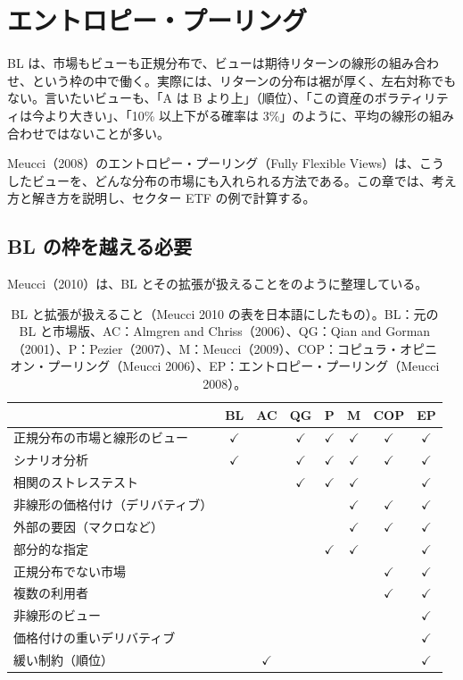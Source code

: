 \chapter{エントロピー・プーリング}\label{ch:ep}

BL は、市場もビューも正規分布で、ビューは期待リターンの線形の組み合わせ、という枠の中で働く。実際には、リターンの分布は裾が厚く、左右対称でもない。言いたいビューも、「A は B より上」（順位）、「この資産のボラティリティは今より大きい」、「10\% 以上下がる確率は 3\%」のように、平均の線形の組み合わせではないことが多い。

Meucci（2008）のエントロピー・プーリング（Fully Flexible Views）は、こうしたビューを、どんな分布の市場にも入れられる方法である。この章では、考え方と解き方を説明し、セクター ETF の例で計算する。

\section{BL の枠を越える必要}

Meucci（2010）は、BL とその拡張が扱えることをのように整理している。

\begin{table}[htbp]
\centering
\caption{BL と拡張が扱えること（Meucci 2010 の表を日本語にしたもの）。BL：元の BL と市場版、AC：Almgren and Chriss（2006）、QG：Qian and Gorman（2001）、P：Pezier（2007）、M：Meucci（2009）、COP：コピュラ・オピニオン・プーリング（Meucci 2006）、EP：エントロピー・プーリング（Meucci 2008）。}
\label{tab:meucci-cap}
\small
\begin{tabular}{lccccccc}
\toprule
 & BL & AC & QG & P & M & COP & EP \\
\midrule
正規分布の市場と線形のビュー & $\checkmark$ & & $\checkmark$ & $\checkmark$ & $\checkmark$ & $\checkmark$ & $\checkmark$ \\
シナリオ分析 & $\checkmark$ & & $\checkmark$ & $\checkmark$ & $\checkmark$ & $\checkmark$ & $\checkmark$ \\
相関のストレステスト & & & $\checkmark$ & $\checkmark$ & $\checkmark$ & & $\checkmark$ \\
非線形の価格付け（デリバティブ） & & & & & $\checkmark$ & $\checkmark$ & $\checkmark$ \\
外部の要因（マクロなど） & & & & & $\checkmark$ & $\checkmark$ & $\checkmark$ \\
部分的な指定 & & & & $\checkmark$ & $\checkmark$ & & $\checkmark$ \\
正規分布でない市場 & & & & & & $\checkmark$ & $\checkmark$ \\
複数の利用者 & & & & & & $\checkmark$ & $\checkmark$ \\
非線形のビュー & & & & & & & $\checkmark$ \\
価格付けの重いデリバティブ & & & & & & & $\checkmark$ \\
緩い制約（順位） & & $\checkmark$ & & & & & $\checkmark$ \\
\bottomrule
\end{tabular}
\end{table}

